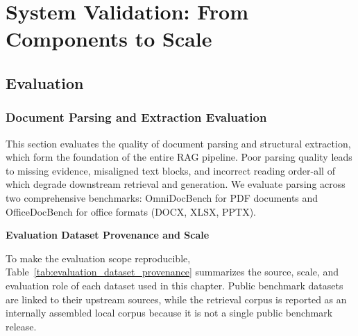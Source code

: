 ﻿\chapter{System Validation: From Components to Scale}

\section{Evaluation}
\subsection{Document Parsing and Extraction Evaluation}

This section evaluates the quality of document parsing and structural extraction, which form the foundation of the entire RAG pipeline. Poor parsing quality leads to missing evidence, misaligned text blocks, and incorrect reading order-all of which degrade downstream retrieval and generation. We evaluate parsing across two comprehensive benchmarks: OmniDocBench for PDF documents and OfficeDocBench for office formats (DOCX, XLSX, PPTX).

\textbf{Evaluation Dataset Provenance and Scale}

To make the evaluation scope reproducible, Table~\ref{tab:evaluation_dataset_provenance} summarizes the source, scale, and evaluation role of each dataset used in this chapter. Public benchmark datasets are linked to their upstream sources, while the retrieval corpus is reported as an internally assembled local corpus because it is not a single public benchmark release.

